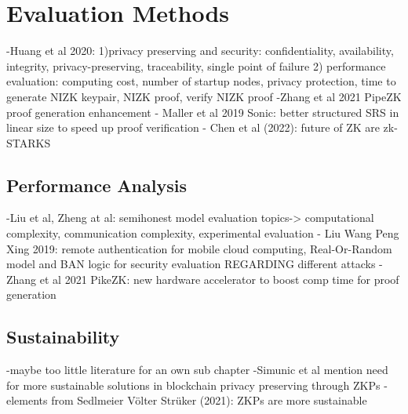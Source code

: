 \section{Evaluation Methods}
-Huang et al 2020: 1)privacy preserving and security: confidentiality, availability, integrity, privacy-preserving, traceability, single point of failure 2) performance evaluation: computing cost, number of startup nodes, privacy protection, time to generate NIZK keypair, NIZK proof, verify NIZK proof
-Zhang et al 2021 PipeZK proof generation enhancement
- Maller et al 2019 Sonic: better structured SRS in linear size to speed up proof verification
- Chen et al (2022): future of ZK are zk-STARKS
\subsection{Performance Analysis}
-Liu et al, Zheng at al: semihonest model evaluation topics-> computational complexity, communication complexity, experimental evaluation
- Liu Wang Peng Xing 2019: remote authentication for mobile cloud computing, Real-Or-Random model and BAN logic for security evaluation REGARDING different attacks
- Zhang et al 2021 PikeZK: new hardware accelerator to boost comp time for proof generation

\subsection{Sustainability}
-maybe too little literature for an own sub chapter
-Simunic et al mention need for more sustainable solutions in blockchain privacy preserving through ZKPs
-elements from Sedlmeier Völter Strüker (2021): ZKPs are more sustainable 

